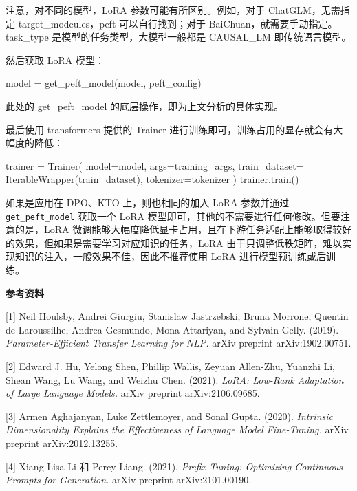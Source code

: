 \documentclass[
]{article}
\newenvironment{Shaded}{}{}
\newcommand{\NormalTok}[1]{#1}
\newcommand{\OperatorTok}[1]{\textcolor[rgb]{0.40,0.40,0.40}{#1}}
\begin{document}
注意，对不同的模型，LoRA 参数可能有所区别。例如，对于 ChatGLM，无需指定
target\_modeules，peft 可以自行找到；对于
BaiChuan，就需要手动指定。task\_type 是模型的任务类型，大模型一般都是
CAUSAL\_LM 即传统语言模型。

然后获取 LoRA 模型：

\begin{Shaded}
\begin{Highlighting}[]
\NormalTok{model }\OperatorTok{=}\NormalTok{ get\_peft\_model(model, peft\_config)}
\end{Highlighting}
\end{Shaded}

此处的 get\_peft\_model 的底层操作，即为上文分析的具体实现。

最后使用 transformers 提供的 Trainer
进行训练即可，训练占用的显存就会有大幅度的降低：

\begin{Shaded}
\begin{Highlighting}[]
\NormalTok{trainer }\OperatorTok{=}\NormalTok{ Trainer(}
\NormalTok{    model}\OperatorTok{=}\NormalTok{model,}
\NormalTok{    args}\OperatorTok{=}\NormalTok{training\_args,}
\NormalTok{    train\_dataset}\OperatorTok{=}\NormalTok{ IterableWrapper(train\_dataset),}
\NormalTok{    tokenizer}\OperatorTok{=}\NormalTok{tokenizer}
\NormalTok{)}
\NormalTok{trainer.train()}
\end{Highlighting}
\end{Shaded}

如果是应用在 DPO、KTO 上，则也相同的加入 LoRA 参数并通过
\texttt{get\_peft\_model} 获取一个 LoRA
模型即可，其他的不需要进行任何修改。但要注意的是，LoRA
微调能够大幅度降低显卡占用，且在下游任务适配上能够取得较好的效果，但如果是需要学习对应知识的任务，LoRA
由于只调整低秩矩阵，难以实现知识的注入，一般效果不佳，因此不推荐使用
LoRA 进行模型预训练或后训练。

\textbf{参考资料}

{[}1{]} Neil Houlsby, Andrei Giurgiu, Stanislaw Jastrzebski, Bruna
Morrone, Quentin de Laroussilhe, Andrea Gesmundo, Mona Attariyan, and
Sylvain Gelly. (2019). \emph{Parameter-Efficient Transfer Learning for
NLP.} arXiv preprint arXiv:1902.00751.

{[}2{]} Edward J. Hu, Yelong Shen, Phillip Wallis, Zeyuan Allen-Zhu,
Yuanzhi Li, Shean Wang, Lu Wang, and Weizhu Chen. (2021). \emph{LoRA:
Low-Rank Adaptation of Large Language Models.} arXiv preprint
arXiv:2106.09685.

{[}3{]} Armen Aghajanyan, Luke Zettlemoyer, and Sonal Gupta. (2020).
\emph{Intrinsic Dimensionality Explains the Effectiveness of Language
Model Fine-Tuning.} arXiv preprint arXiv:2012.13255.

{[}4{]} Xiang Lisa Li 和 Percy Liang. (2021). \emph{Prefix-Tuning:
Optimizing Continuous Prompts for Generation.} arXiv preprint
arXiv:2101.00190.
\end{document}
